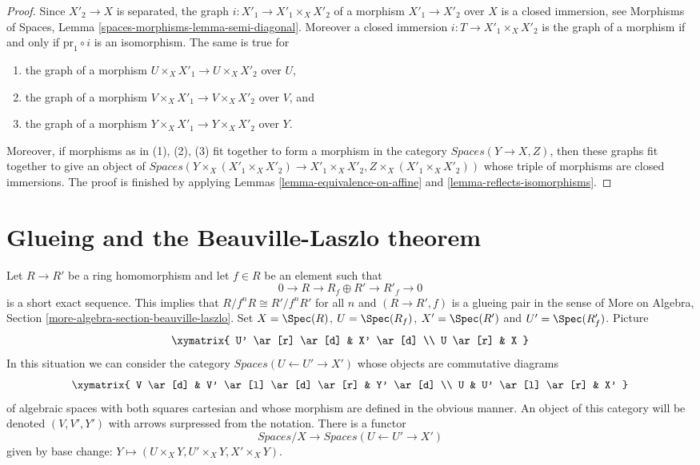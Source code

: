 \begin{proof}
Since $X'_2 \to X$ is separated, the graph $i : X'_1 \to X'_1 \times_X X'_2$
of a morphism $X'_1 \to X'_2$ over $X$ is a closed immersion, see
Morphisms of Spaces, Lemma \ref{spaces-morphisms-lemma-semi-diagonal}.
Moreover a closed immersion $i : T \to X'_1 \times_X X'_2$ is the graph of a
morphism if and only if $\text{pr}_1 \circ i$ is an isomorphism.
The same is true for
\begin{enumerate}
\item the graph of a morphism $U \times_X X'_1 \to U \times_X X'_2$ over $U$,
\item the graph of a morphism $V \times_X X'_1 \to V \times_X X'_2$ over $V$,
and
\item the graph of a morphism $Y \times_X X'_1 \to Y \times_X X'_2$ over $Y$.
\end{enumerate}
Moreover, if morphisms as in (1), (2), (3) fit together to form a
morphism in the category $\textit{Spaces}(Y \to X, Z)$, then these
graphs fit together to give an object of
$\textit{Spaces}(Y \times_X (X'_1 \times_X X'_2) \to X'_1 \times_X X'_2,
Z \times_X (X'_1 \times_X X'_2))$
whose triple of morphisms are closed immersions. The proof is finished
by applying Lemmas \ref{lemma-equivalence-on-affine} and
\ref{lemma-reflects-isomorphisms}.
\end{proof}









\section{Glueing and the Beauville-Laszlo theorem}
\label{section-glueing-beauville-laszlo}

\noindent
Let $R \to R'$ be a ring homomorphism and let $f \in R$ be an element such that
$$
0 \to R \to R_f \oplus R' \to R'_f \to 0
$$
is a short exact sequence. This implies that $R/f^nR \cong R'/f^nR'$
for all $n$ and $(R \to R', f)$ is a glueing pair in the sense of
More on Algebra, Section \ref{more-algebra-section-beauville-laszlo}.
Set $X = \Spec(R)$, $U = \Spec(R_f)$, $X' = \Spec(R')$ and
$U' = \Spec(R'_f)$. Picture
$$
\xymatrix{
U' \ar[r] \ar[d] & X' \ar[d] \\
U \ar[r] & X
}
$$
In this situation we can consider the category
$\textit{Spaces}(U \leftarrow U' \to X')$ whose objects
are commutative diagrams
$$
\xymatrix{
V \ar[d] & V' \ar[l] \ar[d] \ar[r] & Y' \ar[d] \\
U & U' \ar[l] \ar[r] & X'
}
$$
of algebraic spaces with both squares cartesian and whose morphism
are defined in the obvious manner. An object of this category will
be denoted $(V, V', Y')$ with arrows surpressed from the notation.
There is a functor
\begin{equation}
\label{equation-beauville-laszlo-glueing-spaces}
\textit{Spaces}/X
\longrightarrow
\textit{Spaces}(U \leftarrow U' \to X')
\end{equation}
given by base change: $Y \mapsto (U \times_X Y, U' \times_X Y, X' \times_X Y)$.


